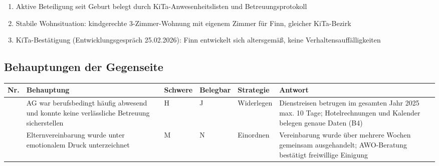 \documentclass[
  11pt,
  a4paper,
]{article}
\newcounter{none}
\providecommand{\tightlist}{%
  \setlength{\itemsep}{0pt}\setlength{\parskip}{0pt}}
\begin{document}
\begin{enumerate}
\def\labelenumi{\arabic{enumi}.}
\tightlist
\item
  Aktive Beteiligung seit Geburt belegt durch KiTa-Anwesenheitslisten
  und Betreuungsprotokoll
\item
  Stabile Wohnsituation: kindgerechte 3-Zimmer-Wohnung mit eigenem
  Zimmer für Finn, gleicher KiTa-Bezirk
\item
  KiTa-Bestätigung (Entwicklungsgespräch 25.02.2026): Finn entwickelt
  sich altersgemäß, keine Verhaltensauffälligkeiten
\end{enumerate}

\subsection{Behauptungen der
Gegenseite}\label{behauptungen-der-gegenseite}

{\def\LTcaptype{none} %
\begin{longtable}[]{@{}
  >{\raggedright\arraybackslash}p{}
  >{\raggedright\arraybackslash}p{}
  >{\raggedright\arraybackslash}p{}
  >{\raggedright\arraybackslash}p{}
  >{\raggedright\arraybackslash}p{}
  >{\raggedright\arraybackslash}p{}@{}}
\toprule\noalign{}
\begin{minipage}[b]{\linewidth}\raggedright
Nr.
\end{minipage} & \begin{minipage}[b]{\linewidth}\raggedright
Behauptung
\end{minipage} & \begin{minipage}[b]{\linewidth}\raggedright
Schwere
\end{minipage} & \begin{minipage}[b]{\linewidth}\raggedright
Belegbar
\end{minipage} & \begin{minipage}[b]{\linewidth}\raggedright
Strategie
\end{minipage} & \begin{minipage}[b]{\linewidth}\raggedright
Antwort
\end{minipage} \\
\midrule\noalign{}
\endhead
\bottomrule\noalign{}
\endlastfoot
1 & AG war berufsbedingt häufig abwesend und konnte keine verlässliche
Betreuung sicherstellen & H & J & Widerlegen & Dienstreisen betrugen im
gesamten Jahr 2025 max. 10 Tage; Hotelrechnungen und Kalender belegen
genaue Daten (B4) \\
2 & Elternvereinbarung wurde unter emotionalem Druck unterzeichnet & M &
N & Einordnen & Vereinbarung wurde über mehrere Wochen gemeinsam
ausgehandelt; AWO-Beratung bestätigt freiwillige Einigung \\
\end{longtable}
}
\end{document}
